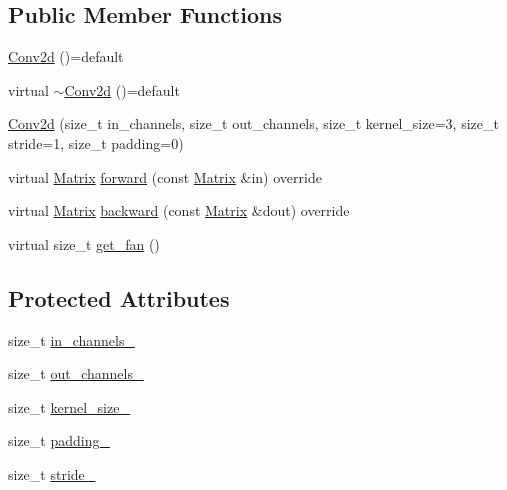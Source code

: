 \subsection*{Public Member Functions}
\begin{DoxyCompactItemize}
\item 
\mbox{\hyperlink{class_conv2d_ae28c4831d44bdf769768f29b9892e5d2}{Conv2d}} ()=default
\item 
virtual \mbox{\hyperlink{class_conv2d_a78911057f811daadff49ec744f063e3c}{$\sim$\+Conv2d}} ()=default
\item 
\mbox{\hyperlink{class_conv2d_a5676e8e1db6826703489568ff32c1436}{Conv2d}} (size\+\_\+t in\+\_\+channels, size\+\_\+t out\+\_\+channels, size\+\_\+t kernel\+\_\+size=3, size\+\_\+t stride=1, size\+\_\+t padding=0)
\item 
virtual \mbox{\hyperlink{class_conv2d_a8263e2f2c46243e39fbca5712603c0fd}{Matrix}} \mbox{\hyperlink{class_conv2d_ab795f6a1cabcfedfb2fcb55c9389c2fe}{forward}} (const \mbox{\hyperlink{class_conv2d_a8263e2f2c46243e39fbca5712603c0fd}{Matrix}} \&in) override
\item 
virtual \mbox{\hyperlink{class_conv2d_a8263e2f2c46243e39fbca5712603c0fd}{Matrix}} \mbox{\hyperlink{class_conv2d_ab5a54c023efbc6206b8f4aa355e5faa9}{backward}} (const \mbox{\hyperlink{class_conv2d_a8263e2f2c46243e39fbca5712603c0fd}{Matrix}} \&dout) override
\item 
virtual size\+\_\+t \mbox{\hyperlink{class_conv2d_a6eeedff6c4d0864a4c3788e06e82a2e4}{get\+\_\+fan}} ()
\end{DoxyCompactItemize}
\subsection*{Protected Attributes}
\begin{DoxyCompactItemize}
\item 
size\+\_\+t \mbox{\hyperlink{class_conv2d_afdb638e506f642d24a8d22fb8c2a821a}{in\+\_\+channels\+\_\+}}
\item 
size\+\_\+t \mbox{\hyperlink{class_conv2d_a48b99a4dee42c4d4221eddedccceffba}{out\+\_\+channels\+\_\+}}
\item 
size\+\_\+t \mbox{\hyperlink{class_conv2d_ad6447ab4000d593e8c4be9bb9c18f92b}{kernel\+\_\+size\+\_\+}}
\item 
size\+\_\+t \mbox{\hyperlink{class_conv2d_a8e548b8a5c0efaf494b819523951b558}{padding\+\_\+}}
\item 
size\+\_\+t \mbox{\hyperlink{class_conv2d_a95a69ad326bc6279247163d50f332b3d}{stride\+\_\+}}
\end{DoxyCompactItemize}


